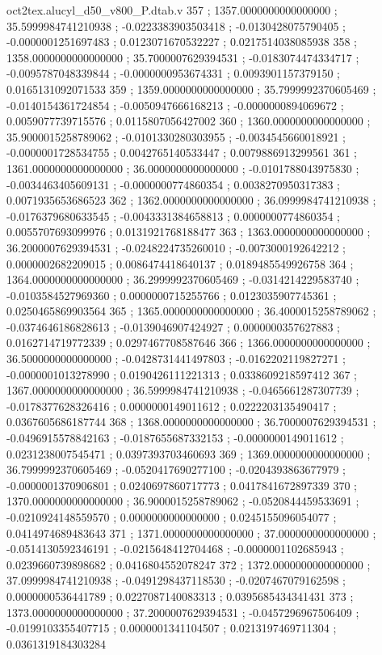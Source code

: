 \begin{filecontents}[overwrite]{oct2tex.alucyl_d50_v800_P.dtab.v}
357 ; 1357.0000000000000000 ; 35.5999984741210938 ; -0.0223383903503418 ; -0.0130428075790405 ; -0.0000001251697483 ; 0.0123071670532227 ; 0.0217514038085938
358 ; 1358.0000000000000000 ; 35.7000007629394531 ; -0.0183074474334717 ; -0.0095787048339844 ; -0.0000000953674331 ; 0.0093901157379150 ; 0.0165131092071533
359 ; 1359.0000000000000000 ; 35.7999992370605469 ; -0.0140154361724854 ; -0.0050947666168213 ; -0.0000000894069672 ; 0.0059077739715576 ; 0.0115807056427002
360 ; 1360.0000000000000000 ; 35.9000015258789062 ; -0.0101330280303955 ; -0.0034545660018921 ; -0.0000001728534755 ; 0.0042765140533447 ; 0.0079886913299561
361 ; 1361.0000000000000000 ; 36.0000000000000000 ; -0.0101788043975830 ; -0.0034463405609131 ; -0.0000000774860354 ; 0.0038270950317383 ; 0.0071935653686523
362 ; 1362.0000000000000000 ; 36.0999984741210938 ; -0.0176379680633545 ; -0.0043331384658813 ; 0.0000000774860354 ; 0.0055707693099976 ; 0.0131921768188477
363 ; 1363.0000000000000000 ; 36.2000007629394531 ; -0.0248224735260010 ; -0.0073000192642212 ; 0.0000002682209015 ; 0.0086474418640137 ; 0.0189485549926758
364 ; 1364.0000000000000000 ; 36.2999992370605469 ; -0.0314214229583740 ; -0.0103584527969360 ; 0.0000000715255766 ; 0.0123035907745361 ; 0.0250465869903564
365 ; 1365.0000000000000000 ; 36.4000015258789062 ; -0.0374646186828613 ; -0.0139046907424927 ; 0.0000000357627883 ; 0.0162714719772339 ; 0.0297467708587646
366 ; 1366.0000000000000000 ; 36.5000000000000000 ; -0.0428731441497803 ; -0.0162202119827271 ; -0.0000001013278990 ; 0.0190426111221313 ; 0.0338609218597412
367 ; 1367.0000000000000000 ; 36.5999984741210938 ; -0.0465661287307739 ; -0.0178377628326416 ; 0.0000000149011612 ; 0.0222203135490417 ; 0.0367605686187744
368 ; 1368.0000000000000000 ; 36.7000007629394531 ; -0.0496915578842163 ; -0.0187655687332153 ; -0.0000000149011612 ; 0.0231238007545471 ; 0.0397393703460693
369 ; 1369.0000000000000000 ; 36.7999992370605469 ; -0.0520417690277100 ; -0.0204393863677979 ; -0.0000001370906801 ; 0.0240697860717773 ; 0.0417841672897339
370 ; 1370.0000000000000000 ; 36.9000015258789062 ; -0.0520844459533691 ; -0.0210924148559570 ; 0.0000000000000000 ; 0.0245155096054077 ; 0.0414974689483643
371 ; 1371.0000000000000000 ; 37.0000000000000000 ; -0.0514130592346191 ; -0.0215648412704468 ; -0.0000001102685943 ; 0.0239660739898682 ; 0.0416804552078247
372 ; 1372.0000000000000000 ; 37.0999984741210938 ; -0.0491298437118530 ; -0.0207467079162598 ; 0.0000000536441789 ; 0.0227087140083313 ; 0.0395685434341431
373 ; 1373.0000000000000000 ; 37.2000007629394531 ; -0.0457296967506409 ; -0.0199103355407715 ; 0.0000001341104507 ; 0.0213197469711304 ; 0.0361319184303284

\end{filecontents}
